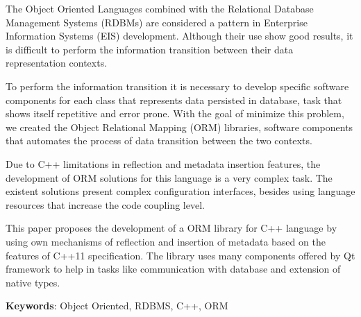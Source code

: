 The Object Oriented Languages combined with the Relational Database Management Systems (RDBMs) are considered a pattern in Enterprise Information Systems (EIS) development. Although their use show good results, it is difficult to perform the information transition between their data representation contexts.

To perform the information transition it is necessary to develop specific software components for each class that represents data persisted in database, task that shows itself repetitive and error prone. With the goal of minimize this problem, we created the Object Relational Mapping (ORM) libraries, software components that automates the process of data transition between the two contexts.

Due to C++ limitations in reflection and metadata insertion features, the development of ORM solutions for this language is a very complex task. The existent solutions present complex configuration interfaces, besides using language resources that increase the code coupling level.

This paper proposes the development of a ORM library for C++ language by using own mechanisms of reflection and insertion of metadata based on the features of C++11 specification. The library uses many components offered by Qt framework to help in tasks like communication with database and extension of native types.

{\bf{Keywords}}: Object Oriented, RDBMS, C++, ORM